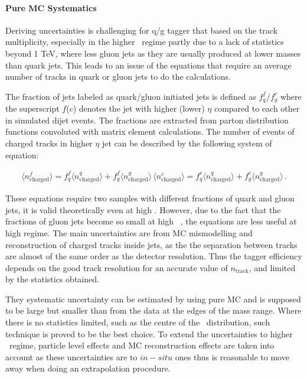 \paragraph{Pure MC Systematics \\}

Deriving uncertainties is challenging for q/g tagger that based on the track multiplicity, especially in the higher \pt\ regime partly due to a lack of statistics beyond 1 TeV, where less gluon jets as they are usually produced at lower masses than quark jets.  This leads to an issue of the equations that require an average number of tracks in quark or gluon jets to do the calculations.

The fraction of jets labeled as quark/gluon initiated jets is defined as $f^f_q$/$f^c_g$ where the superscript $f$($c$) denotes the jet with higher (lower) $\eta$ compared to each other in simulated dijet events. The fractions are extracted from parton distribution functions convoluted with matrix element calculations. The number of events of charged tracks in higher $\eta$ jet can be described by the following system of equation:


\begin{eqnarray}
\langle n^f_{\mathrm{charged}} \rangle = f^f_q \langle n^q_{\mathrm{charged}}\rangle + f^f_g\langle n^g_{\mathrm{charged}}\rangle\, 
\langle n^c_{\mathrm{charged}} \rangle = f^c_q \langle n^q_{\mathrm{charged}}\rangle + f^c_g\langle n^g_{\mathrm{charged}}\rangle\, .
\end{eqnarray}

These equations require two samples with different fractions of quark and gluon jets, it is valid theoretically even at high \pt. However, due to the fact that the fractions of gluon jets become so small at high \pt~, the equations are less useful at high \pt regime. The main uncertainties are from MC mismodelling and reconstruction of charged 
tracks inside jets, as the the separation between tracks are almost of the same order as the detector resolution. Thus the tagger efficiency depends on the good track resolution for an accurate value of $n_\mathrm{track}$, and limited by the statistics obtained.

They systematic uncertainty can be estimated by using pure MC and is supposed to be large but smaller than from the data at the edges of the mass range. Where there is no statistics limited, such as the centre of the \pt\ distribution, such technique is proved to be the best choice. To extend the uncertainties to higher \pt~regime,  particle level effects and MC reconstruction effects are taken into account as these uncertainties are to $in-situ$ ones thus is reasonable to move away when doing an extrapolation procedure.

